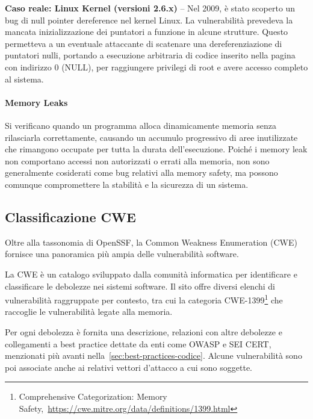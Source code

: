   \textbf{Caso reale: Linux Kernel (versioni 2.6.x)} -- Nel 2009, è stato scoperto
  un bug di null pointer dereference nel kernel Linux. La vulnerabilità prevedeva la
  mancata inizializzazione dei puntatori a funzione in alcune strutture. Questo
  permetteva a un eventuale attaccante di scatenare una dereferenziazione di
  puntatori nulli, portando a esecuzione arbitraria di codice inserito nella pagina
  con indirizzo 0 (NULL), per raggiungere privilegi di root e avere accesso
  completo al sistema.~\cite{null_pointer_dereference_linux}

  \paragraph{Memory Leaks}
  \label{sec:memory_leaks} Si verificano quando un programma alloca dinamicamente memoria
  senza rilasciarla correttamente, causando un accumulo progressivo di aree
  inutilizzate che rimangono occupate per tutta la durata dell'esecuzione. Poiché i
  memory leak non comportano accessi non autorizzati o errati alla memoria, non
  sono generalmente cosiderati come bug relativi alla memory safety, ma possono comunque
  compromettere la stabilità e la sicurezza di un sistema.

  \subsection{Classificazione CWE}
  Oltre alla tassonomia di OpenSSF, la Common Weakness Enumeration (CWE) fornisce
  una panoramica più ampia delle vulnerabilità software.

  La CWE è un catalogo sviluppato dalla comunità informatica per identificare e
  classificare le debolezze nei sistemi software. Il sito offre diversi elenchi di
  vulnerabilità raggruppate per contesto, tra cui la categoria CWE-1399\footnote{Comprehensive
  Categorization: Memory Safety,~\url{https://cwe.mitre.org/data/definitions/1399.html}}
  che raccoglie le vulnerabilità legate alla memoria.

  Per ogni debolezza è fornita una descrizione, relazioni con altre debolezze e
  collegamenti a best practice dettate da enti come OWASP e SEI CERT, menzionati più
  avanti nella~\autoref{sec:best-practices-codice}. Alcune vulnerabilità sono poi
  associate anche ai relativi vettori d'attacco a cui sono soggette.